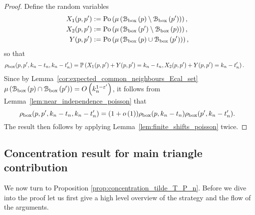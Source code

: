 \begin{proof}
Define the random variables
\begin{align*}
	X_1(p,p^\prime) &:= {\mathrm{Po}}\left(\mu\left({\mathcal B}_{\text{box}}\left(p\right)\setminus {\mathcal B}_{\text{box}}\left(p^\prime\right)\right)\right),\\
	X_2(p,p^\prime) &:= {\mathrm{Po}}\left(\mu\left({\mathcal B}_{\text{box}}\left(p^\prime\right)\setminus {\mathcal B}_{\text{box}}\left(p\right)\right)\right),\\
	Y(p,p^\prime) &:= {\mathrm{Po}}\left(\mu\left({\mathcal B}_{\text{box}}\left(p\right) \cup {\mathcal B}_{\text{box}}\left(p^\prime\right)\right)\right),
\end{align*}
so that
\begin{align*}
	\rho_{\text{box}}(p,p^\prime,k_n-t_n,k_n-t_n^\prime) &= \mathbb{P}\left(X_1(p,p^\prime) + Y(p,p^\prime) = k_n-t_n, X_2(p,p^\prime) + Y(p,p^\prime) = k_n - t_n^\prime\right).
\end{align*}
Since by Lemma~\ref{cor:expected_common_neighbours_Ecal_set} $\mu\left({\mathcal B}_{\text{box}}\left(p\right) \cap {\mathcal B}_{\text{box}}\left(p^\prime\right)\right) = O\left(k_n^{1-\varepsilon^\prime}\right)$, it follows from Lemma~\ref{lem:near_independence_poisson} that
\[
	\rho_{\text{box}}(p,p^\prime,k_n-t_n,k_n-t_n^\prime) = (1+o\left(1\right))\rho_{\text{box}}(p,k_n-t_n)\rho_{\text{box}}(p^\prime,k_n-t_n^\prime).
\]
The result then follows by applying Lemma~\ref{lem:finite_shifts_poisson} twice.
\end{proof}

\subsection{Concentration result for main triangle contribution}\label{ssec:concentration_tilde_T}

We now turn to Proposition \ref{prop:concentration_tilde_T_P_n}. Before we dive into the proof let us first give a high level overview of the strategy and the flow of the arguments. 


